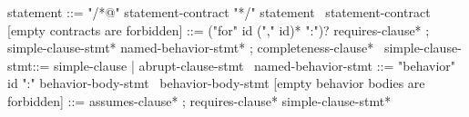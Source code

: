 \begin{syntax}
  statement ::= "/*@" statement-contract "*/" statement
  \
  statement-contract [empty contracts are forbidden] ::= ("for" id ("," id)* ":")? requires-clause* ;
    simple-clause-stmt* named-behavior-stmt* ;
    completeness-clause*
  \
  simple-clause-stmt::= simple-clause | abrupt-clause-stmt
  \
  named-behavior-stmt ::= "behavior" id ":" behavior-body-stmt
  \
  behavior-body-stmt [empty behavior bodies are forbidden] ::= assumes-clause* ;
       requires-clause* simple-clause-stmt*
\end{syntax}

